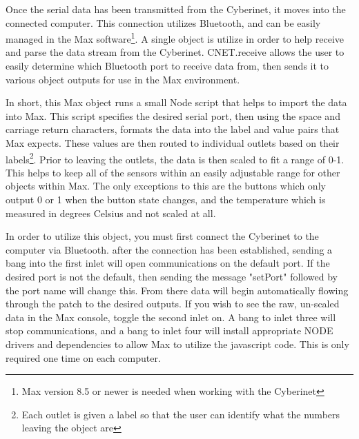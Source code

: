 Once the serial data has been transmitted from the Cyberinet, it moves into the connected computer. This connection utilizes Bluetooth, and can be easily managed in the Max software\footnote{Max version 8.5 or newer is needed when working with the Cyberinet}. A single object is utilize in order to help receive and parse the data stream from the Cyberinet. CNET.receive allows the user to easily determine which Bluetooth port to receive data from, then sends it to various object outputs for use in the Max environment.


In short, this Max object runs a small Node script that helps to import the data into Max. This script specifies the desired serial port, then using the space and carriage return characters, formats the data into the label and value pairs that Max expects. These values are then routed to individual outlets based on their labels\footnote{Each outlet is given a label so that the user can identify what the numbers leaving the object are}. Prior to leaving the outlets, the data is then scaled to fit a range of 0-1. This helps to keep all of the sensors within an easily adjustable range for other objects within Max. The only exceptions to this are the buttons which only output 0 or 1 when the button state changes, and the temperature which is measured in degrees Celsius and not scaled at all. 

In order to utilize this object, you must first connect the Cyberinet to the computer via Bluetooth. after the connection has been established, sending a bang into the first inlet will open communications on the default port. If the desired port is not the default, then sending the message "setPort" followed by the port name will change this. From there data will begin automatically flowing through the patch to the desired outputs. If you wish to see the raw, un-scaled data in the Max console, toggle the second inlet on. A bang to inlet three will stop communications, and a bang to inlet four will install appropriate NODE drivers and dependencies to allow Max to utilize the javascript code. This is only required one time on each computer.

